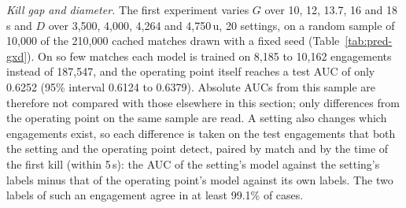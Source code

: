 \emph{Kill gap and diameter.} The first experiment varies $G$ over 10, 12, 13.7, 16 and 18\,s and $D$
over 3,500, 4,000, 4,264 and 4,750\,u, 20 settings, on a random sample of 10,000 of the 210,000 cached
matches drawn with a fixed seed (Table~\ref{tab:pred-gxd}). On so few matches each model is trained on
8,185 to 10,162 engagements instead of 187,547, and the operating point itself reaches a test AUC of only
0.6252 (95\% interval 0.6124 to 0.6379). Absolute AUCs from this sample are therefore not compared with those
elsewhere in this section; only differences from the operating point on the same sample are read. A setting also
changes which engagements exist, so each difference is taken on the test engagements that both the setting
and the operating point detect, paired by match and by the time of the first kill (within 5\,s): the AUC
of the setting's model against the setting's labels minus that of the operating point's model against its
own labels. The two labels of such an engagement agree in at least 99.1\% of cases.

